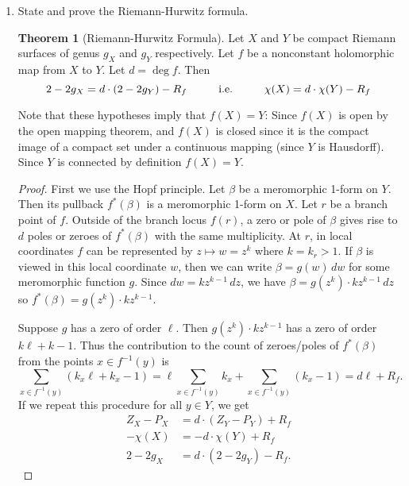 \documentclass[11pt,oneside,english,reqno]{amsart}
\theoremstyle{definition}
\newtheorem*{theorem*}{Theorem}
\newcommand{\pspace}{\hspace{10mm}}
\newcommand{\lspace}{\vspace{5mm}}
\begin{document}
\rightline{\today}

\lspace




\begin{enumerate}[leftmargin=*]
\itemsep5mm


\item State and prove the Riemann-Hurwitz formula.

\begin{theorem*}[Riemann-Hurwitz Formula]
Let $X$ and $Y$ be compact Riemann surfaces of genus $g_X$ and $g_Y$ respectively. Let $f$ be a nonconstant holomorphic map from $X$ to $Y$. Let $d=\deg f$. Then
\[
2-2g_X=d\cdot(2-2g_Y)-R_f \pspace\text{i.e.} \pspace \chi(X)=d\cdot\chi(Y)-R_f
\]
\end{theorem*}

Note that these hypotheses imply that $f(X)=Y$: Since $f(X)$ is open by the open mapping theorem, and $f(X)$ is closed since it is the compact image of a compact set under a continuous mapping (since $Y$ is Hausdorff). Since $Y$ is connected by definition $f(X)=Y$.

\begin{proof}
First we use the Hopf principle. Let $\beta$ be a meromorphic 1-form on $Y$. Then its pullback $f^*(\beta)$ is a meromorphic 1-form on $X$. Let $r$ be a branch point of $f$. Outside of the branch locus $f(r)$, a zero or pole of $\beta$ gives rise to $d$ poles or zeroes of $f^*(\beta)$ with the same multiplicity. At $r$, in local coordinates $f$ can be represented by $z\mapsto w=z^k$ where $k=k_r>1$. If $\beta$ is viewed in this local coordinate $w$, then we can write $\beta=g(w)\,dw$ for some meromorphic function $g$. Since $dw=kz^{k-1}\,dz$, we have $\beta=g(z^k)\cdot kz^{k-1}\,dz$ so $f^*(\beta)=g(z^k)\cdot kz^{k-1}$.

Suppose $g$ has a zero of order $\ell$. Then $g(z^k)\cdot kz^{k-1}$ has a zero of order $k\ell+k-1$. Thus the contribution to the count of zeroes/poles of $f^*(\beta)$ from the points $x\in f^{-1}(y)$ is
\[
\sum_{x\in f^{-1}(y)}(k_x\ell+k_x-1)=\ell\sum_{x\in f^{-1}(y)}k_x+\sum_{x\in f^{-1}(y)}(k_x-1)=d\ell+R_f.
\]
If we repeat this procedure for all $y\in Y$, we get
\begin{align*}
Z_X-P_X&=d\cdot(Z_Y-P_Y)+R_f\\
-\chi(X)&=-d\cdot\chi(Y)+R_f\\
2-2g_X&=d\cdot(2-2g_Y)-R_f.
\end{align*}


\end{proof}
\end{enumerate}
\end{document}
